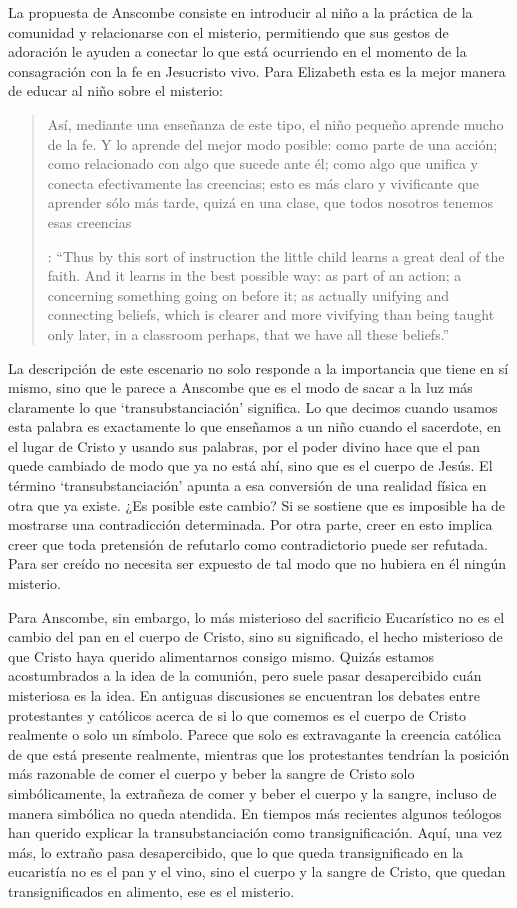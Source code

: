 La propuesta de Anscombe consiste en introducir al niño a la práctica de la comunidad y relacionarse con el misterio, permitiendo que sus gestos de adoración le ayuden a conectar lo que está ocurriendo en el momento de la consagración con la fe en Jesucristo vivo. Para Elizabeth esta es la mejor manera de educar al niño sobre el misterio: \blockquote[{\cite[107]{anscombe1981erp:ot}}: \enquote{Thus by this sort of instruction the little child learns a great deal of the faith. And it learns in the best possible way: as part of an action; a concerning something going on before it; as actually unifying and connecting beliefs, which is clearer and more vivifying than being taught only later, in a classroom perhaps, that we have all these beliefs.}]{Así, mediante una enseñanza de este tipo, el niño pequeño aprende mucho de la fe. Y lo aprende del mejor modo posible: como parte de una acción; como relacionado con algo que sucede ante él; como algo que unifica y conecta efectivamente las creencias; esto es más claro y vivificante que aprender sólo más tarde, quizá en una clase, que todos nosotros tenemos esas creencias}.

La descripción de este escenario no solo responde a la importancia que tiene en sí mismo, sino que le parece a Anscombe que es el modo de sacar a la luz más claramente lo que `transubstanciación' significa. Lo que decimos cuando usamos esta palabra es exactamente lo que enseñamos a un niño cuando el sacerdote, en el lugar de Cristo y usando sus palabras, por el poder divino hace que el pan quede cambiado de modo que ya no está ahí, sino que es el cuerpo de Jesús. El término `transubstanciación' apunta a esa conversión de una realidad física en otra que ya existe. ¿Es posible este cambio? Si se sostiene que es imposible ha de mostrarse una contradicción determinada. Por otra parte, creer en esto implica creer que toda pretensión de refutarlo como contradictorio puede ser refutada. Para ser creído no necesita ser expuesto de tal modo que no hubiera en él ningún misterio.

Para Anscombe, sin embargo, lo más misterioso del sacrificio Eucarístico no es el cambio del pan en el cuerpo de Cristo, sino su significado, el hecho misterioso de que Cristo haya querido alimentarnos consigo mismo. Quizás estamos acostumbrados a la idea de la comunión, pero suele pasar desapercibido cuán misteriosa es la idea. En antiguas discusiones se encuentran los debates entre protestantes y católicos acerca de si lo que comemos es el cuerpo de Cristo realmente o solo un símbolo. Parece que solo es extravagante la creencia católica de que está presente realmente, mientras que los protestantes tendrían la posición más razonable de comer el cuerpo y beber la sangre de Cristo solo simbólicamente, la extrañeza de comer y beber el cuerpo y la sangre, incluso de manera simbólica no queda atendida. En tiempos más recientes algunos teólogos han querido explicar la transubstanciación como transignificación. Aquí, una vez más, lo extraño pasa desapercibido, que lo que queda transignificado en la eucaristía no es el pan y el vino, sino el cuerpo y la sangre de Cristo, que quedan transignificados en alimento, ese es el misterio.

